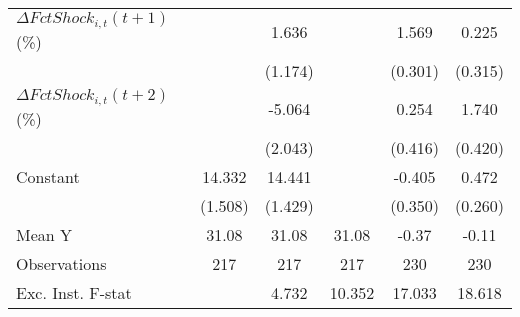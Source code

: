 {\begin{tabular}{l*{5}{c}}
\addlinespace
$ \Delta FctShock_{i,t}(t+1)$ (\%)&                     &       1.636         &                     &       1.569\sym{***}&       0.225         \\
                    &                     &     (1.174)         &                     &     (0.301)         &     (0.315)         \\
\addlinespace
$ \Delta FctShock_{i,t}(t+2)$ (\%)&                     &      -5.064\sym{**} &                     &       0.254         &       1.740\sym{***}\\
                    &                     &     (2.043)         &                     &     (0.416)         &     (0.420)         \\
\addlinespace
Constant            &      14.332\sym{***}&      14.441\sym{***}&                     &      -0.405         &       0.472\sym{*}  \\
                    &     (1.508)         &     (1.429)         &                     &     (0.350)         &     (0.260)         \\
\midrule
Mean Y              &       31.08         &       31.08         &       31.08         &       -0.37         &       -0.11         \\
Observations        &         217         &         217         &         217         &         230         &         230         \\
Exc. Inst. F-stat   &                     &       4.732         &      10.352         &      17.033         &      18.618         \\
\bottomrule
\end{tabular}
}
